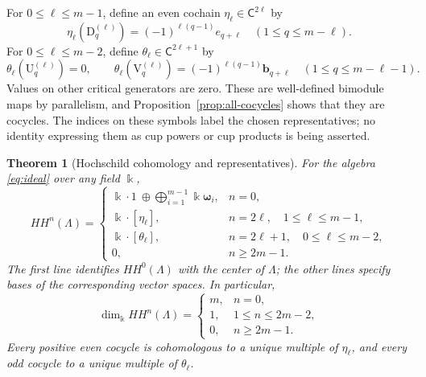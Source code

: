 \documentclass[a4paper,11pt,oneside,reqno]{amsart}
\newtheorem{theorem}{Theorem}[section]
\theoremstyle{definition}
\numberwithin{equation}{section}
\begin{document}
	For $0\leq\ell\leq m-1$, define an even cochain
	$\eta_\ell\in \mathsf C^{2\ell}$ by
	\begin{equation}\label{eq:eta-representatives}
		\boxed{\eta_\ell(\mathrm{D}_q^{(\ell)})
			=(-1)^{\ell(q-1)}e_{q+\ell}
			\quad(1\leq q\leq m-\ell).}
	\end{equation}
	For $0\leq\ell\leq m-2$, define
	$\theta_\ell\in \mathsf C^{2\ell+1}$ by
	\begin{equation}\label{eq:theta-representatives}
		\boxed{
			\theta_\ell(\mathrm{U}_q^{(\ell)})=0,\qquad
			\theta_\ell(\mathrm{V}_q^{(\ell)})
			=(-1)^{\ell(q-1)}\mathbf{b}_{q+\ell}
			\quad(1\leq q\leq m-\ell-1).}
	\end{equation}
	Values on other critical generators are zero.  These are well-defined
	bimodule maps by parallelism, and
	Proposition~\ref{prop:all-cocycles} shows that they are cocycles.
	The indices on these symbols label the chosen representatives; no
	identity expressing them as cup powers or cup products is being
	asserted.
	
	\begin{theorem}[Hochschild cohomology and representatives]\label{thm:HH}
		For the algebra \eqref{eq:ideal} over any field $\Bbbk$,
		\begin{equation}\label{eq:HH-result}
			HH^n(\Lambda)=
			\begin{cases}
				\Bbbk\cdot1\ \oplus\displaystyle\bigoplus_{i=1}^{m-1}\Bbbk\boldsymbol{\omega}_i,&n=0,\\[1mm]
				\Bbbk\cdot[\eta_\ell],&n=2\ell,\quad1\leq\ell\leq m-1,\\
				\Bbbk\cdot[\theta_\ell],&n=2\ell+1,\quad0\leq\ell\leq m-2,\\
				0,&n\geq2m-1.
			\end{cases}
		\end{equation}
		The first line identifies $HH^0(\Lambda)$ with the center of $\Lambda$;
		the other lines specify bases of the corresponding vector spaces.
		In particular,
		\begin{equation}\label{eq:HH-dimensions}
			\boxed{\dim_{\Bbbk}HH^n(\Lambda)=
				\begin{cases}
					m,&n=0,\\
					1,&1\leq n\leq2m-2,\\
					0,&n\geq2m-1.
			\end{cases}}
		\end{equation}
		Every positive even cocycle is cohomologous to a unique multiple of
		$\eta_\ell$, and every odd cocycle to a unique multiple of $\theta_\ell$.
	\end{theorem}
	
\end{document}
